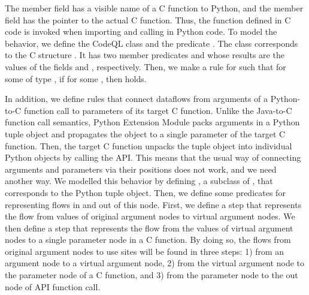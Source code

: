 \noindent
The member field  has a visible name of a C function to Python,
and the member field  has the pointer to the actual C function.
Thus, the function  defined in C code is invoked when
importing and calling  in Python code.
To model the behavior, we define the CodeQL class 
and the predicate . The class 
corresponds to the C structure . It has
two member predicates  and  whose results are
the values of the fields  and , respectively.
Then, we make a rule for  such that for some  of type ,
if  
for some , then   holds.



In addition, we define rules that connect dataflows from arguments of
a Python-to-C function call to parameters of its target C function.
Unlike the Java-to-C function call semantics, Python Extension Module
packs arguments in a Python tuple object and propagates the object to a single
parameter of the target C function. 
Then, the target C function unpacks the tuple object into individual Python
objects by calling the  API. 
This means that the usual way of connecting arguments and parameters via their
positions does not work, and we need another way.
We modelled this behavior by defining , a subclass of ,
that corresponds to the Python tuple object. Then, we define some predicates
for representing flows in and out of this node. First, we define a
step that represents the flow from values of original argument nodes to virtual argument nodes. We then define
a step that represents the flow from the values of virtual argument nodes to a single parameter node in a C function.
By doing so, the flows from original argument nodes to use sites will be
found in three steps: 1) from an argument node to a virtual argument node,
2) from the virtual argument node to the parameter node of a C function,
and 3) from the parameter node to the out node of  API function call.



